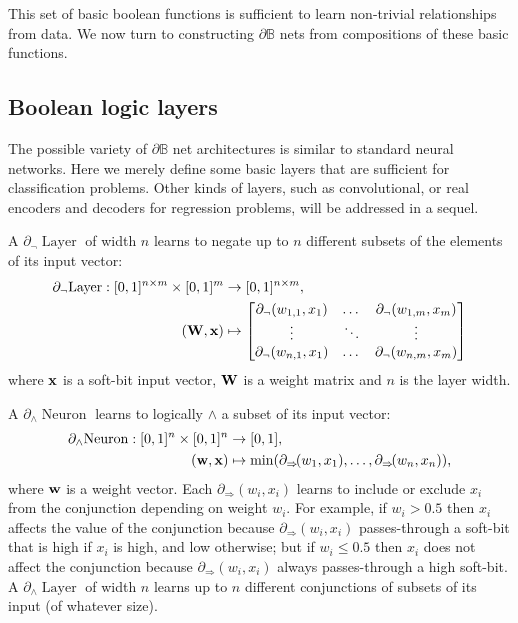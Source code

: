 \documentclass{article} %
\begin{document}
This set of basic boolean functions is sufficient to learn non-trivial relationships from data. We now turn to constructing $\partial\mathbb{B}$ nets from compositions of these basic functions.

\subsection{Boolean logic layers}

The possible variety of $\partial\mathbb{B}$ net architectures is similar to standard neural networks. Here we merely define some basic layers that are sufficient for classification problems. Other kinds of layers, such as convolutional, or real encoders and decoders for regression problems, will be addressed in a sequel.

A $\partial_{\neg} \!\operatorname{Layer}$ of width $n$ learns to negate up to $n$ different subsets of the elements of its input vector:
\begin{equation*}
\begin{aligned}
\partial_{\neg} \!\operatorname{Layer}: [0,1]^{n \times m} \times [0,1]^{m} &\to [0,1]^{n \times m}, \\
({\bf W}, {\bf x}) &\mapsto 
\begin{bmatrix}
\partial_{\neg}(w_{1,1}, x_{1}) & \dots & \partial_{\neg}(w_{1,m}, x_{m}) \\
\vdots & \ddots & \vdots \\
\partial_{\neg}(w_{n,1}, x_{1}) & \dots & \partial_{\neg}(w_{n,m}, x_{m})
\end{bmatrix}
\end{aligned}
\end{equation*}
where ${\bf x}$ is a soft-bit input vector, ${\bf W}$ is a weight matrix and $n$ is the layer width.

A $\partial_{\wedge}\!\operatorname{Neuron}$ learns to logically $\wedge$ a subset of its input vector:
\begin{equation*}
\begin{aligned}
\partial_{\wedge}\!\operatorname{Neuron}: [0,1]^{n} \times [0,1]^{n} &\to [0,1], \\
({\bf w}, {\bf x}) &\mapsto \min(\partial_{\Rightarrow}\!(w_{1}, x_{1}), \dots, \partial_{\Rightarrow}\!(w_{n}, x_{n}))\text{,}
\end{aligned}
\end{equation*}
where ${\bf w}$ is a weight vector. Each $\partial_{\Rightarrow}(w_{i},x_{i})$ learns to include or exclude $x_{i}$ from the conjunction depending on weight $w_{i}$. For example, if $w_{i}>0.5$ then $x_{i}$ affects the value of the conjunction because $\partial_{\Rightarrow}(w_{i},x_{i})$ passes-through a soft-bit that is high if $x_{i}$ is high, and low otherwise; but if $w_{i} \leq 0.5$ then $x_{i}$ does not affect the conjunction because $\partial_{\Rightarrow}(w_{i},x_{i})$ always passes-through a high soft-bit. A $\partial_{\wedge}\!\operatorname{Layer}$ of width $n$ learns up to $n$ different conjunctions of subsets of its input (of whatever size).
\end{document}
